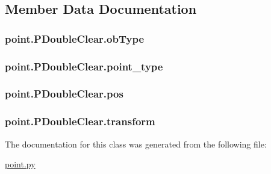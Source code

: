 \subsection{Member Data Documentation}
\hypertarget{classpoint_1_1_p_double_clear_a5541242e024d4ff0b279d79bd6f6dce6}{}
\subsubsection[{ob\+Type}]{\setlength{\rightskip}{0pt plus 5cm}point.\+P\+Double\+Clear.\+ob\+Type}\label{classpoint_1_1_p_double_clear_a5541242e024d4ff0b279d79bd6f6dce6}
\hypertarget{classpoint_1_1_p_double_clear_af5eeea4a2fbc7d0120ea721984a3feae}{}
\subsubsection[{point\+\_\+type}]{\setlength{\rightskip}{0pt plus 5cm}point.\+P\+Double\+Clear.\+point\+\_\+type}\label{classpoint_1_1_p_double_clear_af5eeea4a2fbc7d0120ea721984a3feae}
\hypertarget{classpoint_1_1_p_double_clear_ad349fbcbf216675a5c33ad59eda87fc9}{}
\subsubsection[{pos}]{\setlength{\rightskip}{0pt plus 5cm}point.\+P\+Double\+Clear.\+pos}\label{classpoint_1_1_p_double_clear_ad349fbcbf216675a5c33ad59eda87fc9}
\hypertarget{classpoint_1_1_p_double_clear_a59e98444f472f8413c8d0cf8531c2530}{}
\subsubsection[{transform}]{\setlength{\rightskip}{0pt plus 5cm}point.\+P\+Double\+Clear.\+transform}\label{classpoint_1_1_p_double_clear_a59e98444f472f8413c8d0cf8531c2530}


The documentation for this class was generated from the following file\+:\begin{DoxyCompactItemize}
\item 
\hyperlink{point_8py}{point.\+py}\end{DoxyCompactItemize}
